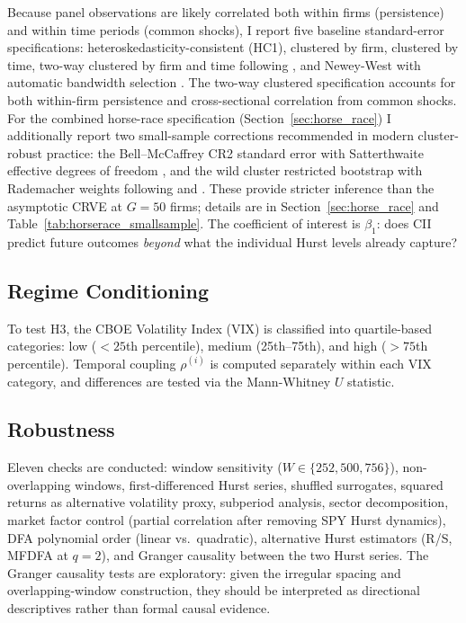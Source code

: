 \documentclass[preprint,12pt,authoryear]{elsarticle}
\begin{document}
Because panel observations are likely correlated both within firms (persistence) and within time periods (common shocks), I report five baseline standard-error specifications: heteroskedasticity-consistent (HC1), clustered by firm, clustered by time, two-way clustered by firm and time following \citet{cameron2011robust}, and Newey-West with automatic bandwidth selection \citep{newey1987simple}. The two-way clustered specification accounts for both within-firm persistence and cross-sectional correlation from common shocks. For the combined horse-race specification (Section~\ref{sec:horse_race}) I additionally report two small-sample corrections recommended in modern cluster-robust practice: the Bell--McCaffrey CR2 standard error with Satterthwaite effective degrees of freedom \citep{imbens2016robust}, and the wild cluster restricted bootstrap with Rademacher weights following \citet{cameron2008bootstrap} and \citet{mackinnon2017wild}. These provide stricter inference than the asymptotic CRVE at $G = 50$ firms; details are in Section~\ref{sec:horse_race} and Table~\ref{tab:horserace_smallsample}. The coefficient of interest is $\beta_1$: does CII predict future outcomes \emph{beyond} what the individual Hurst levels already capture?

\subsection{Regime Conditioning}

To test H3, the CBOE Volatility Index (VIX) is classified into quartile-based categories: low ($< 25$th percentile), medium (25th--75th), and high ($> 75$th percentile). Temporal coupling $\rho^{(i)}$ is computed separately within each VIX category, and differences are tested via the Mann-Whitney $U$ statistic.

\subsection{Robustness}

Eleven checks are conducted: window sensitivity ($W \in \{252, 500, 756\}$), non-overlapping windows, first-differenced Hurst series, shuffled surrogates, squared returns as alternative volatility proxy, subperiod analysis, sector decomposition, market factor control (partial correlation after removing SPY Hurst dynamics), DFA polynomial order (linear vs.\ quadratic), alternative Hurst estimators (R/S, MFDFA at $q = 2$), and Granger causality between the two Hurst series. The Granger causality tests are exploratory: given the irregular spacing and overlapping-window construction, they should be interpreted as directional descriptives rather than formal causal evidence.
\end{document}
